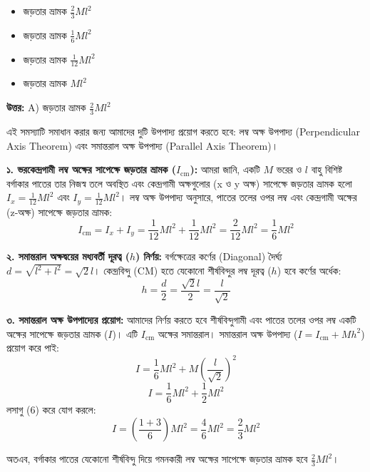 \documentclass[12pt, a4paper]{article}
\begin{document}
\vspace{1em}

\begin{itemize}[label={}, leftmargin=1cm, itemsep=0.5em]
\item[\textbf{A)}] জড়তার ভ্রামক $\frac{2}{3} M l^2$
\item[\textbf{B)}] জড়তার ভ্রামক $\frac{1}{6} M l^2$
\item[\textbf{C)}] জড়তার ভ্রামক $\frac{1}{12} M l^2$
\item[\textbf{D)}] জড়তার ভ্রামক $M l^2$
\end{itemize}

\vspace{0.5em}
\begin{tcolorbox}[answerbox]
\textbf{\color{success} উত্তর:} A) জড়তার ভ্রামক $\frac{2}{3} M l^2$
\end{tcolorbox}
\vspace{1em}

\begin{tcolorbox}[solutionbox={সমাধান (Solution)}]
\noindent
এই সমস্যাটি সমাধান করার জন্য আমাদের দুটি উপপাদ্য প্রয়োগ করতে হবে: লম্ব অক্ষ উপপাদ্য (Perpendicular Axis Theorem) এবং সমান্তরাল অক্ষ উপপাদ্য (Parallel Axis Theorem)।

\vspace{0.5em}
\textbf{১. ভরকেন্দ্রগামী লম্ব অক্ষের সাপেক্ষে জড়তার ভ্রামক ($I_{\text{cm}}$):}
আমরা জানি, একটি $M$ ভরের ও $l$ বাহু বিশিষ্ট বর্গাকার পাতের তার নিজস্ব তলে অবস্থিত এবং কেন্দ্রগামী অক্ষগুলোর (x ও y অক্ষ) সাপেক্ষে জড়তার ভ্রামক হলো $I_x = \frac{1}{12} Ml^2$ এবং $I_y = \frac{1}{12} Ml^2$। 
লম্ব অক্ষ উপপাদ্য অনুসারে, পাতের তলের ওপর লম্ব এবং কেন্দ্রগামী অক্ষের (z-অক্ষ) সাপেক্ষে জড়তার ভ্রামক:
$$I_{\text{cm}} = I_x + I_y = \frac{1}{12} M l^2 + \frac{1}{12} M l^2 = \frac{2}{12} M l^2 = \frac{1}{6} M l^2$$

\vspace{0.5em}
\textbf{২. সমান্তরাল অক্ষদ্বয়ের মধ্যবর্তী দূরত্ব ($h$) নির্ণয়:}
বর্গক্ষেত্রের কর্ণের (Diagonal) দৈর্ঘ্য $d = \sqrt{l^2 + l^2} = \sqrt{2}l$।
কেন্দ্রবিন্দু (CM) হতে যেকোনো শীর্ষবিন্দুর লম্ব দূরত্ব ($h$) হবে কর্ণের অর্ধেক:
$$h = \frac{d}{2} = \frac{\sqrt{2}l}{2} = \frac{l}{\sqrt{2}}$$

\vspace{0.5em}
\textbf{৩. সমান্তরাল অক্ষ উপপাদ্যের প্রয়োগ:}
আমাদের নির্ণয় করতে হবে শীর্ষবিন্দুগামী এবং পাতের তলের ওপর লম্ব একটি অক্ষের সাপেক্ষে জড়তার ভ্রামক ($I$)। এটি $I_{\text{cm}}$ অক্ষের সমান্তরাল। সমান্তরাল অক্ষ উপপাদ্য ($I = I_{\text{cm}} + Mh^2$) প্রয়োগ করে পাই:
$$I = \frac{1}{6} M l^2 + M \left(\frac{l}{\sqrt{2}}\right)^2$$
$$I = \frac{1}{6} M l^2 + \frac{1}{2} M l^2$$
লসাগু ($6$) করে যোগ করলে:
$$I = \left(\frac{1 + 3}{6}\right) M l^2 = \frac{4}{6} M l^2 = \frac{2}{3} M l^2$$

অতএব, বর্গাকার পাতের যেকোনো শীর্ষবিন্দু দিয়ে গমনকারী লম্ব অক্ষের সাপেক্ষে জড়তার ভ্রামক হবে $\frac{2}{3} M l^2$।
\end{tcolorbox}
\vspace{1em}
\end{document}
